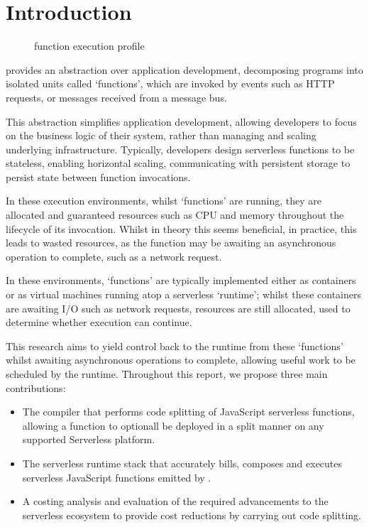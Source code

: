 \chapter{Introduction}

\begin{figure}
    \begin{center}
        
    \end{center}
    \caption{\faas{} function execution profile}
\end{figure}

\faasxlong{} provides an abstraction over application development, decomposing programs into isolated units called `functions', which are invoked by events such as HTTP requests, or messages received from a message bus.

This abstraction simplifies application development, allowing developers to focus on the business logic of their system, rather than managing and scaling underlying infrastructure. Typically, developers design serverless functions to be stateless, enabling horizontal scaling, communicating with persistent storage to persist state between function invocations.

In these execution environments, whilst `functions' are running, they are allocated and guaranteed resources such as CPU and memory throughout the lifecycle of its invocation. Whilst in theory this seems beneficial, in practice, this leads to wasted resources, as the function may be awaiting an asynchronous operation to complete, such as a network request.

In these environments, `functions' are typically implemented either as containers or as virtual machines running atop a serverless `runtime'; whilst these containers are awaiting I/O such as network requests, resources are still allocated, used to determine whether execution can continue.

This research aims to yield control back to the runtime from these `functions' whilst awaiting asynchronous operations to complete, allowing useful work to be scheduled by the runtime. Throughout this report, we propose three main contributions:

\begin{itemize}
    \item The \faaasc{} compiler that performs code splitting of JavaScript serverless functions, allowing a function to optionall be deployed in a split manner on any supported Serverless\cite{serverlessServerlessZeroFrictionServerless2024} platform.

    \item The \faaastime{} serverless runtime stack that accurately bills, composes and executes serverless JavaScript functions emitted by \faaasc{}.

    \item A costing analysis and evaluation of the required advancements to the serverless ecosystem to provide cost reductions by carrying out code splitting.
\end{itemize}

